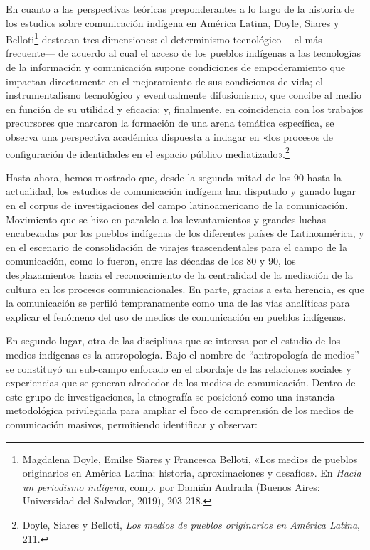 \documentclass{tufte-handout}
\begin{document}
En cuanto a las perspectivas teóricas preponderantes a lo largo de la
historia de los estudios sobre comunicación indígena en América Latina,
Doyle, Siares y Belloti\footnote{Magdalena Doyle, Emilse Siares y
  Francesca Belloti, «Los medios de pueblos originarios en América
  Latina: historia, aproximaciones y desafíos». En \emph{Hacia un
  periodismo indígena}, comp. por Damián Andrada (Buenos Aires:
  Universidad del Salvador, 2019), 203-218.} destacan tres dimensiones:
el determinismo tecnológico ---el más frecuente--- de acuerdo al cual el
acceso de los pueblos indígenas a las tecnologías de la información y
comunicación supone condiciones de empoderamiento que impactan
directamente en el mejoramiento de sus condiciones de vida; el
instrumentalismo tecnológico y eventualmente difusionismo, que concibe
al medio en función de su utilidad y eficacia; y, finalmente, en
coincidencia con los trabajos precursores que marcaron la formación de
una arena temática específica, se observa una perspectiva académica
dispuesta a indagar en «los procesos de configuración de identidades en
el espacio público mediatizado».\footnote{Doyle, Siares y Belloti,
  \emph{Los medios de pueblos originarios en América Latina}, 211.}

Hasta ahora, hemos mostrado que, desde la segunda mitad de los 90 hasta
la actualidad, los estudios de comunicación indígena han disputado y
ganado lugar en el corpus de investigaciones del campo latinoamericano
de la comunicación. Movimiento que se hizo en paralelo a los
levantamientos y grandes luchas encabezadas por los pueblos indígenas de
los diferentes países de Latinoamérica, y en el escenario de
consolidación de virajes trascendentales para el campo de la
comunicación, como lo fueron, entre las décadas de los 80 y 90, los
desplazamientos hacia el reconocimiento de la centralidad de la
mediación de la cultura en los procesos comunicacionales. En parte,
gracias a esta herencia, es que la comunicación se perfiló tempranamente
como una de las vías analíticas para explicar el fenómeno del uso de
medios de comunicación en pueblos indígenas.

En segundo lugar, otra de las disciplinas que se interesa por el estudio
de los medios indígenas es la antropología. Bajo el nombre de
``antropología de medios'' se constituyó un sub-campo enfocado en el
abordaje de las relaciones sociales y experiencias que se generan
alrededor de los medios de comunicación. Dentro de este grupo de
investigaciones, la etnografía se posicionó como una instancia
metodológica privilegiada para ampliar el foco de comprensión de los
medios de comunicación masivos, permitiendo identificar y observar:
\end{document}
